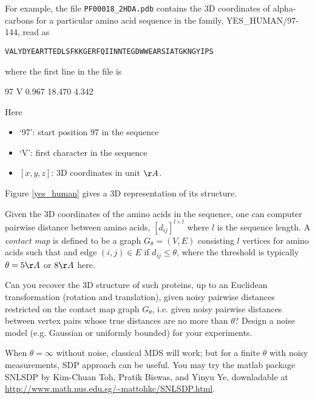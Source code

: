 \documentclass[11pt]{article}
\begin{document}
\begin{enumerate}
For example, the file {\tt PF00018\_2HDA.pdb} contains the 3D coordinates of alpha-carbons for a particular amino acid sequence in the family, YES\_HUMAN/97-144, read as

{\tt{VALYDYEARTTEDLSFKKGERFQIINNTEGDWWEARSIATGKNGYIPS}}

\noindent where the first line in the file is 

97	V	0.967	18.470	4.342

\noindent Here
\begin{itemize}
\item `97': start position 97 in the sequence
\item `V': first character in the sequence
\item $[x,y,z]$: 3D coordinates in unit $\AA$.
\end{itemize}

\noindent Figure \ref{yes_human} gives a 3D representation of its structure. 


Given the 3D coordinates of the amino acids in the sequence, one can computer pairwise distance between amino acids, $[d_{ij}]^{l\times l}$ where $l$ is the sequence length. A \emph{contact map} is defined to be a graph $G_\theta=(V,E)$ consisting $l$ vertices for amino acids such that and edge $(i,j)\in E$ if $d_{ij} \leq \theta$, where the threshold is typically $\theta=5\AA$ or $8\AA$ here. 

Can you recover the 3D structure of such proteins, up to an Euclidean transformation (rotation and translation), given noisy pairwise distances restricted on the contact map graph $G_\theta$, i.e. given noisy pairwise distances between vertex pairs whose true distances are no more than $\theta$? Design a noise model (e.g. Gaussian or uniformly bounded) for your experiments. 

When $\theta=\infty$ without noise, classical MDS will work; but for a finite $\theta$ with noisy measurements, SDP approach can be useful. You may try the matlab package SNLSDP by Kim-Chuan Toh, Pratik Biswas, and Yinyu Ye, downladable at \url{http://www.math.nus.edu.sg/~mattohkc/SNLSDP.html}. 


\end{enumerate}
\end{document}
